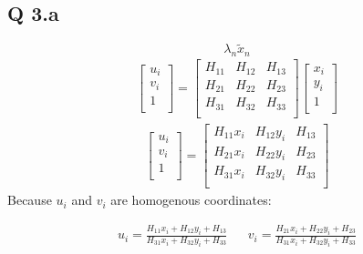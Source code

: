 \documentclass[11pt]{article}
\begin{document}
\subsection*{Q 3.a}
$$\lambda_n\tilde{x}_n$$
\begin{align}
    \begin{bmatrix}
        u_i\\
        v_i\\
        1\\
    \end{bmatrix}
    =
    \begin{bmatrix}
        H_{11} & H_{12} & H_{13}\\
        H_{21} & H_{22} & H_{23}\\
        H_{31} & H_{32} & H_{33}\\
    \end{bmatrix}
    \begin{bmatrix}
        x_i\\
        y_i\\
        1\\
    \end{bmatrix}
\end{align}
\begin{align}
    \begin{bmatrix}
        u_i\\
        v_i\\
        1\\
    \end{bmatrix}
    =
    \begin{bmatrix}
        H_{11}x_i & H_{12}y_i & H_{13}\\
        H_{21}x_i & H_{22}y_i & H_{23}\\
        H_{31}x_i & H_{32}y_i & H_{33}\\
    \end{bmatrix}
\end{align}
Because $u_i$ and $v_i$ are homogenous coordinates: 

\begin{align}
u_i = \frac{H_{11}x_i + H_{12}y_i + H_{13}}{H_{31}x_i + H_{32}y_i + H_{33}}
&      &
v_i = \frac{H_{21}x_i + H_{22}y_i + H_{23}}{H_{31}x_i + H_{32}y_i + H_{33}}
\end{align}
\end{document}

